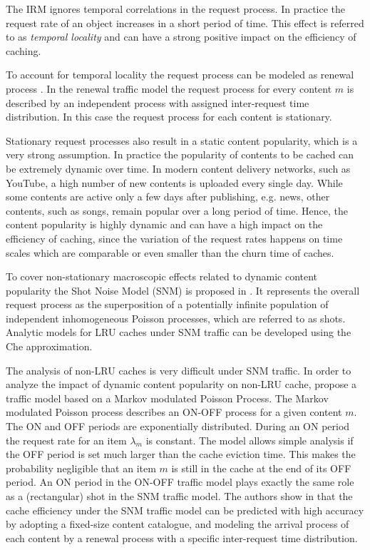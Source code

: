 The IRM ignores temporal correlations in the request process.
In practice the request rate of an object increases in a short period of time.
This effect is referred to as \textit{temporal locality} and can have a strong positive impact on the efficiency of caching.

To account for temporal locality the request process can be modeled as renewal process \cite{martina2014unified}.
In the renewal traffic model the request process for every content $m$ is described by an independent process with assigned inter-request time distribution.
In this case the request process for each content is stationary.

Stationary request processes also result in a static content popularity, which is a very strong assumption.
In practice the popularity of contents to be cached can be extremely dynamic over time.
In modern content delivery networks, such as YouTube, a high number of new contents is uploaded every single day.
While some contents are active only a few days after publishing, e.g. news, other contents, such as songs, remain popular over a long period of time.
Hence, the content popularity is highly dynamic and can have a high impact on the efficiency of caching, since the variation of the request rates happens on time scales which are comparable or even smaller than the churn time of caches.

To cover non-stationary macroscopic effects related to dynamic content popularity the Shot Noise Model (SNM) is proposed in \cite{traverso2013temporal}.
It represents the overall request process as the superposition of a potentially infinite population of independent inhomogeneous Poisson processes, which are referred to as shots.
Analytic models for LRU caches under SNM traffic can be developed using the Che approximation.

The analysis of non-LRU caches is very difficult under SNM traffic.
In order to analyze the impact of dynamic content popularity on non-LRU cache, \cite{garetto2014dynamic} propose a traffic model based on a Markov modulated Poisson Process.
The Markov modulated Poisson process describes an ON-OFF process for a given content $m$.
The ON and OFF periods are exponentially distributed.
During an ON period the request rate for an item $\lambda_m$ is constant.
The model allows simple analysis if the OFF period is set much larger than the cache eviction time.
This makes the probability negligible that an item $m$ is still in the cache at the end of its OFF period.
An ON period in the ON-OFF traffic model plays exactly the same role as a (rectangular) shot in the SNM traffic model.
The authors show in \cite{garetto2014dynamic} that the cache efficiency under the SNM traffic model can be predicted with high accuracy by adopting a fixed-size content catalogue, and modeling the arrival process of each content by a renewal process with a specific inter-request time distribution.

